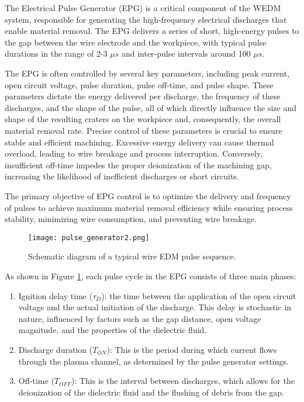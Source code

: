 \documentclass[11pt]{article}
\begin{document}
The Electrical Pulse Generator (EPG) is a critical component of the WEDM system, responsible for generating the high-frequency electrical discharges that enable material removal. The EPG delivers a series of short, high-energy pulses to the gap between the wire electrode and the workpiece, with typical pulse durations in the range of 2-3 $\mu s$ and inter-pulse intervals around 100 $\mu s$.

The EPG is often controlled by several key parameters, including peak current, open circuit voltage, pulse duration, pulse off-time, and pulse shape. These parameters dictate the energy delivered per discharge, the frequency of these discharges, and the shape of the pulse, all of which directly influence the size and shape of the resulting craters on the workpiece and, consequently, the overall material removal rate. Precise control of these parameters is crucial to ensure stable and efficient machining. Excessive energy delivery can cause thermal overload, leading to wire breakage and process interruption. Conversely, insufficient off-time impedes the proper deionization of the machining gap, increasing the likelihood of inefficient discharges or short circuits. 

The primary objective of EPG control is to optimize the delivery and frequency of pulses to achieve maximum material removal efficiency while ensuring process stability, minimizing wire consumption, and preventing wire breakage.

\begin{figure}[H]
    \centering
    \texttt{[image: pulse\_generator2.png]}
    \caption{Schematic diagram of a typical wire EDM pulse sequence.}
    \label{fig:pulse_generator}
\end{figure}

As shown in Figure \ref{fig:pulse_generator}, each pulse cycle in the EPG consists of three main phases:

\begin{enumerate}
    \item Ignition delay time ($\tau_D$): the time between the application of the open circuit voltage and the actual initiation of the discharge. This delay is stochastic in nature, influenced by factors such as the gap distance, open voltage magnitude, and the properties of the dielectric fluid.
    
    \item Discharge duration ($T_{ON}$): This is the period during which current flows through the plasma channel, as determined by the pulse generator settings.
    
    \item Off-time ($T_{OFF}$): This is the interval between discharges, which allows for the deionization of the dielectric fluid and the flushing of debris from the gap. 
\end{enumerate}
\end{document}
